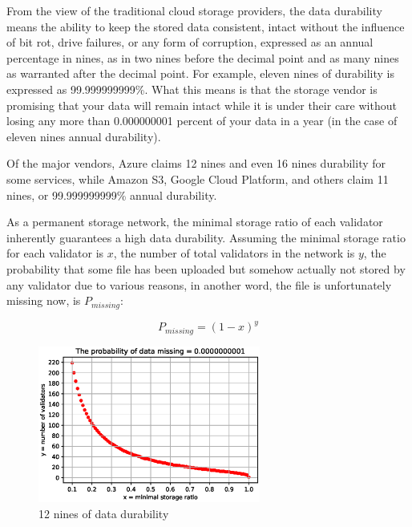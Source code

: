 \documentclass[]{article}
\newcounter{subsubsubsection}[subsubsection]
\begin{document}


From the view of the traditional cloud storage providers, the data durability means the ability to keep the stored data consistent, intact without the influence of bit rot, drive failures, or any form of corruption, expressed as an annual percentage in nines, as in two nines before the decimal point and as many nines as warranted after the decimal point. For example, eleven nines of durability is expressed as 99.999999999\%. What this means is that the storage vendor is promising that your data will remain intact while it is under their care without losing any more than 0.000000001 percent of your data in a year (in the case of eleven nines annual durability)\cite{storagedurability}.

Of the major vendors, Azure claims 12 nines and even 16 nines durability for some services, while Amazon S3, Google Cloud Platform, and others claim 11 nines, or 99.999999999\% annual durability.

As a permanent storage network, the minimal storage ratio of each validator inherently guarantees a high data durability. Assuming the minimal storage ratio for each validator is $x$, the number of total validators in the network is $y$, the probability that some file has been uploaded but somehow actually not stored by any validator due to various reasons, in another word, the file is unfortunately missing now, is $P_{missing}$:

$$
P_{missing} = (1-x)^y
$$

\begin{figure}[H]
\centering
\includegraphics[width=0.65\textwidth]{P_data_missing}
\caption{12 nines of data durability}
\label{Fig.P_data_missing}
\end{figure}
\end{document}
